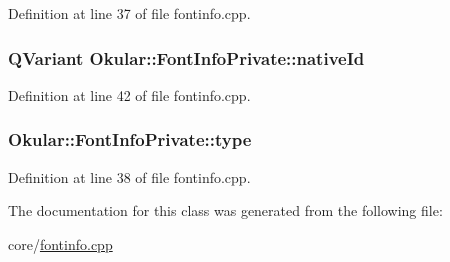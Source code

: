 Definition at line 37 of file fontinfo.\+cpp.

\hypertarget{classOkular_1_1FontInfoPrivate_aa3410ecfd4fc44d7fd0e7029d3f5f50f}{
\subsubsection[{native\+Id}]{\setlength{\rightskip}{0pt plus 5cm}Q\+Variant Okular\+::\+Font\+Info\+Private\+::native\+Id}}\label{classOkular_1_1FontInfoPrivate_aa3410ecfd4fc44d7fd0e7029d3f5f50f}


Definition at line 42 of file fontinfo.\+cpp.

\hypertarget{classOkular_1_1FontInfoPrivate_ae8a2de8a47a6241febd6fe850fc53e3e}{
\subsubsection[{type}]{ Okular\+::\+Font\+Info\+Private\+::type}}\label{classOkular_1_1FontInfoPrivate_ae8a2de8a47a6241febd6fe850fc53e3e}


Definition at line 38 of file fontinfo.\+cpp.



The documentation for this class was generated from the following file\+:\begin{DoxyCompactItemize}
\item 
core/\hyperlink{fontinfo_8cpp}{fontinfo.\+cpp}\end{DoxyCompactItemize}
